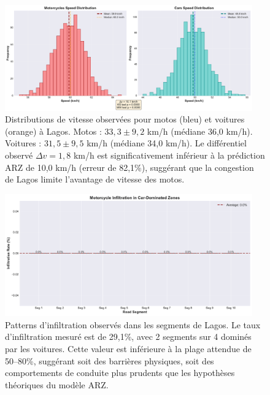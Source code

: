 \begin{figure}[H]
    \centering
    \includegraphics[width=0.95\textwidth]{SPRINT4_DELIVERABLES/figures/speed_distributions.pdf}
    \caption{Distributions de vitesse observées pour motos (bleu) et voitures (orange) à Lagos.
        Motos : $33{,}3 \pm 9{,}2$ km/h (médiane 36,0 km/h).
        Voitures : $31{,}5 \pm 9{,}5$ km/h (médiane 34,0 km/h).
        Le différentiel observé $\Delta v = 1{,}8$ km/h est significativement inférieur à la prédiction ARZ de 10,0 km/h (erreur de 82,1\%), suggérant que la congestion de Lagos limite l'avantage de vitesse des motos.}
    \label{fig:speed_distributions}
\end{figure}

\begin{figure}[H]
    \centering
    \includegraphics[width=0.95\textwidth]{SPRINT4_DELIVERABLES/figures/infiltration_patterns.pdf}
    \caption{Patterns d'infiltration observés dans les segments de Lagos.
        Le taux d'infiltration mesuré est de 29,1\%, avec 2 segments sur 4 dominés par les voitures.
        Cette valeur est inférieure à la plage attendue de 50--80\%, suggérant soit des barrières physiques, soit des comportements de conduite plus prudents que les hypothèses théoriques du modèle ARZ.}
    \label{fig:infiltration_patterns}
\end{figure}

